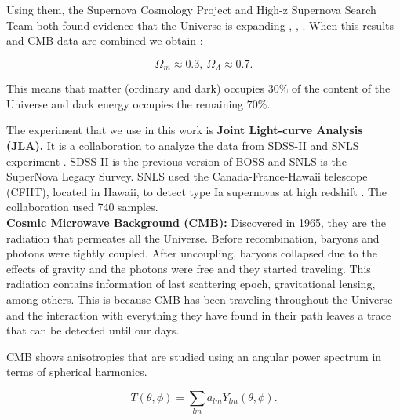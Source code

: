\documentclass[onecolumn,           %
               showpacs,            %
               preprintnumbers,     %
               aps,                 %
               letterpaper,             %
               superscriptaddress,      %
               nofootinbib,         %
               tightenlines,        %
               floats,floatfix      %
               ,usenatbib,
               ]{revtex4-1}
\begin{document}
Using them, the Supernova Cosmology Project and High-z Supernova Search Team both found evidence that the Universe is expanding \cite{supernova1}, \cite{supernova2}, \cite{supernova3}. When this results and CMB data are combined we obtain \cite{parametros}:

\begin{equation}
\Omega_m \approx 0.3, \ \Omega_{\Lambda} \approx 0.7 .
\end{equation}

This means that matter (ordinary and dark) occupies $30 \%$ of the content of the Universe and dark energy occupies the remaining $70 \%$. 

The experiment that we use in this work is \textbf{Joint Light-curve Analysis (JLA).} It is a collaboration to analyze the data from SDSS-II and SNLS experiment \cite{jla}. SDSS-II is the previous version of BOSS and SNLS is the SuperNova Legacy Survey. SNLS used the Canada-France-Hawaii telescope (CFHT), located in Hawaii, to detect type Ia supernovas at high redshift \cite{snls}. The collaboration used 740 samples. \\

%

\textbf{Cosmic Microwave Background (CMB):} Discovered in 1965, they are the radiation that permeates all the Universe. Before recombination, baryons and photons were tightly coupled. After uncoupling, baryons collapsed due to the effects of gravity and the photons were free and they started traveling. This radiation contains information of last scattering epoch, gravitational lensing, among others. This is because CMB has been traveling throughout the Universe and the interaction with everything they have found in their path leaves a trace that can be detected until our days.

CMB shows anisotropies that are studied using an angular power spectrum in terms of spherical harmonics.

\begin{equation}
T(\theta, \phi) = \sum_{lm} a_{lm} Y_{lm} \left(\theta, \phi \right) .
\end{equation}
\end{document}
